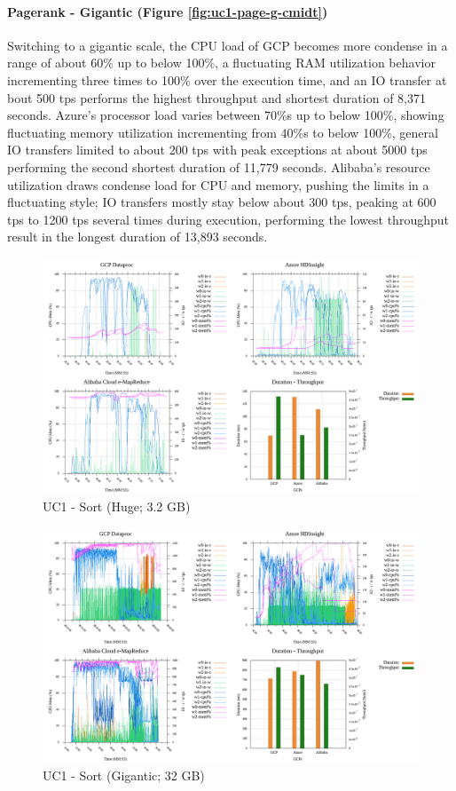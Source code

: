 \documentclass[review]{elsarticle}
\begin{document}
\paragraph{Pagerank - Gigantic (Figure \ref{fig:uc1-page-g-cmidt})}Switching to a gigantic scale, the CPU load of GCP becomes more condense in a range of about 60\% up to below 100\%, a fluctuating RAM utilization behavior incrementing three times to 100\% over the execution time, and an IO transfer at bout 500 tps performs the highest throughput and shortest duration of 8,371 seconds. Azure's processor load varies between 70\%s up to below 100\%, showing fluctuating memory utilization incrementing from 40\%s to below 100\%, general IO transfers limited to about 200 tps with peak exceptions at about 5000 tps performing the second shortest duration of 11,779 seconds. Alibaba's resource utilization draws condense load for CPU and memory, pushing the limits in a fluctuating style; IO transfers mostly stay below about 300 tps, peaking at 600 tps to 1200 tps several times during execution, performing the lowest throughput result in the longest duration of 13,893 seconds.

\begin{figure}[p]
	\caption{UC1 - Sort (Huge; 3.2 GB)}
	\label{fig:uc1-srt-h-cmidt}
	\includegraphics[width=\textwidth]{uc1-srt-h-cmidt}
	\centering
\end{figure}

\begin{figure}[p]
	\caption{UC1 - Sort (Gigantic; 32 GB)}
	\label{fig:uc1-srt-g-cmidt}
	\includegraphics[width=\textwidth]{uc1-srt-g-cmidt}
	\centering
\end{figure}
\end{document}
